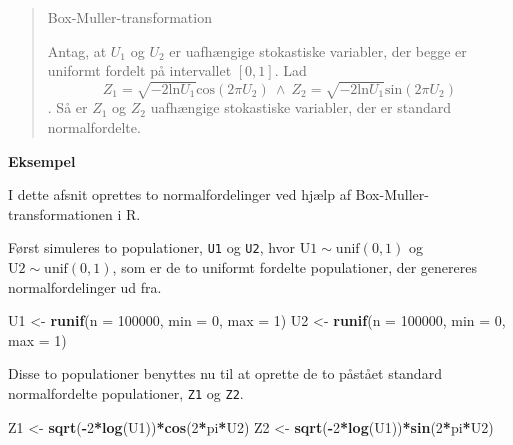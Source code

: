 \documentclass[
]{book}
\newenvironment{Shaded}{\begin{snugshade}}{\end{snugshade}}
\newcommand{\DataTypeTok}[1]{\textcolor[rgb]{0.13,0.29,0.53}{#1}}
\newcommand{\DecValTok}[1]{\textcolor[rgb]{0.00,0.00,0.81}{#1}}
\newcommand{\KeywordTok}[1]{\textcolor[rgb]{0.13,0.29,0.53}{\textbf{#1}}}
\newcommand{\NormalTok}[1]{#1}
\newcommand{\OperatorTok}[1]{\textcolor[rgb]{0.81,0.36,0.00}{\textbf{#1}}}
\newcommand{\StringTok}[1]{\textcolor[rgb]{0.31,0.60,0.02}{#1}}
\theoremstyle{definition}
\theoremstyle{definition}
\theoremstyle{definition}
\theoremstyle{remark}
\let\BeginKnitrBlock\begin \let\EndKnitrBlock\end
\begin{document}
\begin{quote}
\BeginKnitrBlock{theorem}
\protect\hypertarget{thm:unnamed-chunk-10}{}{\label{thm:unnamed-chunk-10} } Box-Muller-transformation

Antag, at \(U_1\) og \(U_2\) er uafhængige stokastiske variabler, der begge er uniformt fordelt på intervallet \([0, 1]\). Lad \[Z_1 = \sqrt{-2 \mathrm{ln} U_1} \mathrm{cos}(2\pi U_2)~ \wedge~ Z_2 = \sqrt{-2 \mathrm{ln} U_1} \mathrm{sin}(2\pi U_2)\]. Så er \(Z_1\) og \(Z_2\) uafhængige stokastiske variabler, der er standard normalfordelte.
\EndKnitrBlock{theorem}
\end{quote}

\textbf{Eksempel}

I dette afsnit oprettes to normalfordelinger ved hjælp af Box-Muller-transformationen i R.

Først simuleres to populationer, \texttt{U1} og \texttt{U2}, hvor \(\mathrm{U1 \sim unif(0,1)}\) og \(\mathrm{U2 \sim unif(0,1)}\), som er de to uniformt fordelte populationer, der genereres normalfordelinger ud fra.

\begin{Shaded}
\begin{Highlighting}[]
\NormalTok{U1 <-}\StringTok{ }\KeywordTok{runif}\NormalTok{(}\DataTypeTok{n =} \DecValTok{100000}\NormalTok{, }\DataTypeTok{min =} \DecValTok{0}\NormalTok{, }\DataTypeTok{max =} \DecValTok{1}\NormalTok{)}
\NormalTok{U2 <-}\StringTok{ }\KeywordTok{runif}\NormalTok{(}\DataTypeTok{n =} \DecValTok{100000}\NormalTok{, }\DataTypeTok{min =} \DecValTok{0}\NormalTok{, }\DataTypeTok{max =} \DecValTok{1}\NormalTok{)}
\end{Highlighting}
\end{Shaded}

Disse to populationer benyttes nu til at oprette de to påstået standard normalfordelte populationer, \texttt{Z1} og \texttt{Z2}.

\begin{Shaded}
\begin{Highlighting}[]
\NormalTok{Z1 <-}\StringTok{ }\KeywordTok{sqrt}\NormalTok{(}\OperatorTok{-}\DecValTok{2}\OperatorTok{*}\KeywordTok{log}\NormalTok{(U1))}\OperatorTok{*}\KeywordTok{cos}\NormalTok{(}\DecValTok{2}\OperatorTok{*}\NormalTok{pi}\OperatorTok{*}\NormalTok{U2)}
\NormalTok{Z2 <-}\StringTok{ }\KeywordTok{sqrt}\NormalTok{(}\OperatorTok{-}\DecValTok{2}\OperatorTok{*}\KeywordTok{log}\NormalTok{(U1))}\OperatorTok{*}\KeywordTok{sin}\NormalTok{(}\DecValTok{2}\OperatorTok{*}\NormalTok{pi}\OperatorTok{*}\NormalTok{U2)}
\end{Highlighting}
\end{Shaded}
\end{document}
